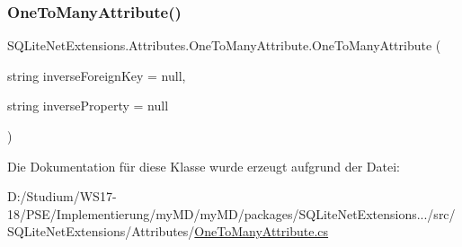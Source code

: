 \subsubsection{\texorpdfstring{One\+To\+Many\+Attribute()}{OneToManyAttribute()}}
{\footnotesize\ttfamily S\+Q\+Lite\+Net\+Extensions.\+Attributes.\+One\+To\+Many\+Attribute.\+One\+To\+Many\+Attribute (\begin{DoxyParamCaption}\item[{string}]{inverse\+Foreign\+Key = {\ttfamily null},  }\item[{string}]{inverse\+Property = {\ttfamily null} }\end{DoxyParamCaption})}



Die Dokumentation für diese Klasse wurde erzeugt aufgrund der Datei\+:\begin{DoxyCompactItemize}
\item 
D\+:/\+Studium/\+W\+S17-\/18/\+P\+S\+E/\+Implementierung/my\+M\+D/my\+M\+D/packages/\+S\+Q\+Lite\+Net\+Extensions.../src/\+S\+Q\+Lite\+Net\+Extensions/\+Attributes/\mbox{\hyperlink{_one_to_many_attribute_8cs}{One\+To\+Many\+Attribute.\+cs}}\end{DoxyCompactItemize}
